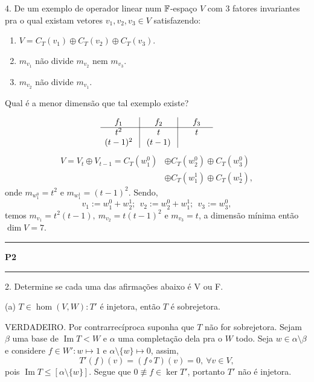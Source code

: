 4. De um exemplo de operador linear num \(\mathbb{F}\)-espaço \(V\) com \(3\) fatores invariantes pra o qual existam vetores \(v_1, v_2, v_3 \in V\) satisfazendo: 
\begin{enumerate}[label = \roman*.]
\item \(V = C_T(v_1) \oplus C_T(v_2) \oplus C_T(v_3)\).
\item \(m_{v_1} \) não divide \(m_{v_2}\) nem \(m_{v_3}\). 
\item \(m_{v_2}\) não divide \(m_{v_1}\). 
\end{enumerate}
Qual é a menor dimensão que tal exemplo existe?  

\textcolor{gris}{\[\begin{array}{c| c| c}
  f_1 \ & \ f_2 \ &\  f_3 \\ \hline  
  t^2 \ & \ t \ &\  t \\ 
  (t-1)^2 \ & \ (t-1) \ &\  \hspace{1cm} \\ 
\end{array}\]
\begin{align*}
  V = V_{t} \oplus V_{t-1} = C_T(w_1^0) &\oplus C_T(w_2^0) \oplus C_T(w_3^0)\\ 
  &\oplus C_T(w_1^1) \oplus C_T(w_2^1), 
\end{align*}
onde \(m_{w_1^0} = t^2\) e \(m_{w_1^1} = (t-1)^2\). Sendo, 
\[v_1 := w_1^0 + w_2^1; \ \ v_2 := w_2^0 + w_1^1; \ \ v_3 := w_3^0, \]
temos \(m_{v_1} = t^2 (t-1), \ m_{v_2} = t (t-1)^2\) e \(m_{v_3} = t\), a dimensão mínima então \(\dim V = 7\).   \\ 
}
 
{\hrule \vspace{-0.15cm}
  \centering \textbf{P2} \vspace{0.1cm}
  \hrule}

2. Determine se cada uma das afirmações abaixo é V ou F.  

(a) \(T \in \hom(V,W): T'\) é injetora, então \(T\) é sobrejetora.  

\textcolor{gris}{VERDADEIRO. Por contrarrecíproca suponha que \(T\) não for sobrejetora. Sejam \(\beta\) uma base de \(\operatorname{Im}T < W\) e \(\alpha \) uma completação dela pra o \(W\) todo. Seja \( w \in \alpha \setminus \beta \) e considere \(f \in W': w\mapsto 1\) e \(\alpha \setminus\{w\} \mapsto 0\), assim, 
\[T'(f)(v) = (f  \circ T) (v) = 0, \ \forall v \in V, \] 
pois \(\operatorname{Im}T \leq [\alpha \setminus \{w\}]\). Segue que \(0 \not\equiv f \in \ker T'\), portanto \(T'\) não é injetora.    
} 

